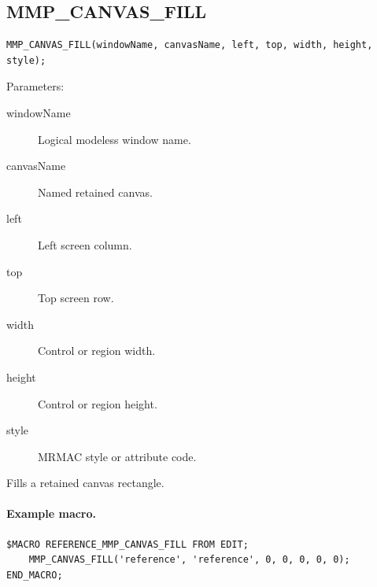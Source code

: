 \documentclass[a4paper,10pt,twoside,openany]{book}
\newenvironment{mrmacextension}{\begin{changebar}}{\end{changebar}}
\begin{document}
\begin{mrmacextension}
\label{prim:procedure-mmp-canvas-fill}
\subsection*{MMP\_CANVAS\_FILL}
\begin{verbatim}
MMP_CANVAS_FILL(windowName, canvasName, left, top, width, height, style);
\end{verbatim}
Parameters:
\begin{description}
\item[windowName] Logical modeless window name.
\item[canvasName] Named retained canvas.
\item[left] Left screen column.
\item[top] Top screen row.
\item[width] Control or region width.
\item[height] Control or region height.
\item[style] MRMAC style or attribute code.
\end{description}

Fills a retained canvas rectangle.

\paragraph{Example macro.}
\begin{verbatim}
$MACRO REFERENCE_MMP_CANVAS_FILL FROM EDIT;
    MMP_CANVAS_FILL('reference', 'reference', 0, 0, 0, 0, 0);
END_MACRO;
\end{verbatim}
\end{mrmacextension}
\end{document}
